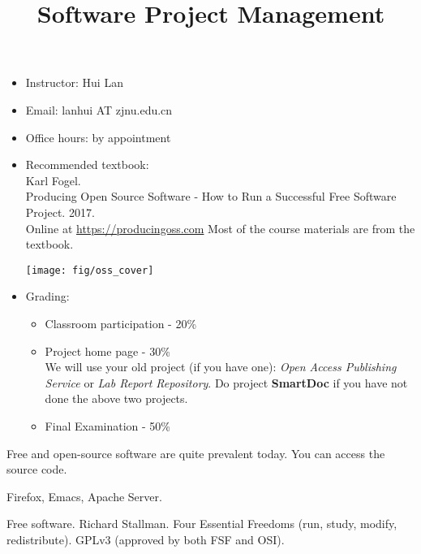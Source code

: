 \documentclass[landscape,30pt]{foils}
\title{Software Project Management}
\author{}
\date{}
\begin{document}
\maketitle


\begin{itemize}
\item Instructor: Hui Lan

\item Email: lanhui AT zjnu.edu.cn

\item Office hours: by appointment

\item Recommended textbook: \\Karl Fogel.  \\
  Producing Open Source Software - How to Run a Successful Free Software Project.  2017. \\
  Online at \url{https://producingoss.com}   Most of the course materials are from the textbook.

  \begin{center}
    \texttt{[image: fig/oss\_cover]}
  \end{center}
  
\item  Grading:
  \begin{itemize}
  \item Classroom participation - 20\%
  \item Project home page - 30\% \\
    {\small We will use your old project (if you have one): {\em Open Access Publishing Service} or {\em  Lab Report Repository}.  Do project {\bf SmartDoc} if you have not done the above two projects. }
  \item Final Examination - 50\%
  \end{itemize}


\end{itemize}



Free and open-source software are quite prevalent today.  You can access the source code.

Firefox, Emacs, Apache Server.

Free software.  Richard Stallman.  Four Essential Freedoms (run, study, modify, redistribute).  GPLv3  (approved by both FSF and OSI).
\end{document}
